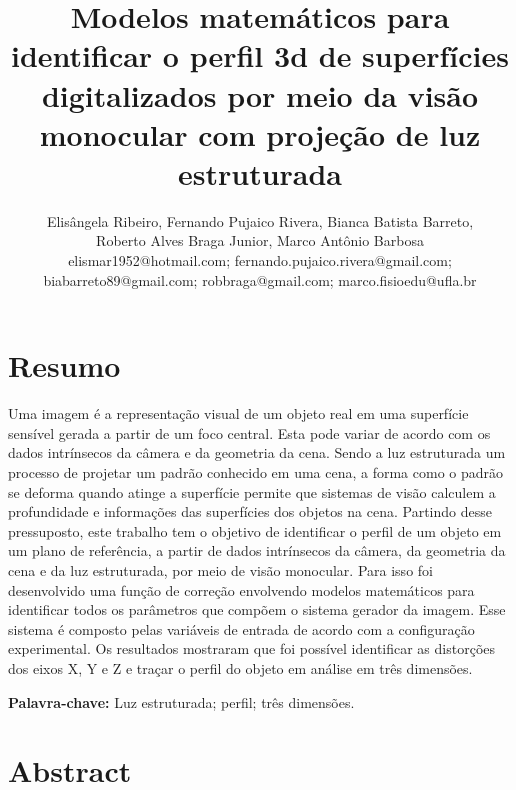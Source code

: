 \documentclass[a4paper, 12pt]{article}
\title{Modelos matemáticos para identificar o perfil 3d de superfícies digitalizados por meio da visão monocular com projeção de luz estruturada}
\author{Elisângela Ribeiro, Fernando Pujaico Rivera, Bianca Batista Barreto,\\Roberto Alves Braga Junior, Marco Antônio Barbosa 
\\elismar1952@hotmail.com; fernando.pujaico.rivera@gmail.com;
\\biabarreto89@gmail.com; robbraga@gmail.com; marco.fisioedu@ufla.br}
\begin{document}
\maketitle

\section*{Resumo}
Uma imagem é a representação visual de um objeto real em uma superfície sensível gerada a partir de um foco central. 
Esta pode variar de acordo com os dados intrínsecos da câmera e da geometria da cena. 
Sendo a luz estruturada um processo de projetar um padrão conhecido em uma cena, a forma como o padrão se deforma quando atinge a superfície permite que sistemas de visão calculem a profundidade e informações das superfícies dos objetos na cena. 
Partindo desse pressuposto, este trabalho tem o objetivo de identificar o perfil de um objeto em um plano de referência, a partir de dados intrínsecos da câmera, da geometria da cena e da luz estruturada, por meio de visão monocular. 
Para isso foi desenvolvido uma função de correção envolvendo modelos matemáticos para identificar todos os parâmetros que compõem o sistema gerador da imagem. 
Esse sistema é composto pelas variáveis de entrada de acordo com a configuração experimental. 
Os resultados mostraram que foi possível identificar as distorções dos eixos X, Y e Z e traçar o perfil do objeto em análise em três dimensões.


\textbf{Palavra-chave:}  Luz estruturada; perfil; três dimensões.

\section*{Abstract}
\end{document}
